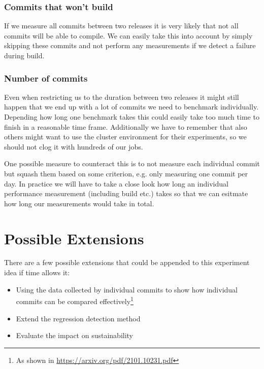 \documentclass[	runningheads,
				a4paper]{llncs}
\begin{document}
\subsubsection{Commits that won't build}
If we measure all commits between two releases it is very likely that not all commits will be able to compile. We can easily take this into account by simply skipping these commits and not perform any measurements if we detect a failure during build.

\subsubsection{Number of commits}
Even when restricting us to the duration between two releases it might still happen that we end up with a lot of commits we need to benchmark individually. Depending how long one benchmark takes this could easily take too much time to finish in a reasonable time frame. Additionally we have to remember that also others might want to use the cluster environment for their experiments, so we should not clog it with hundreds of our jobs.

One possible measure to counteract this is to not measure each individual commit but squash them based on some criterion, e.g. only measuring one commit per day. In practice we will have to take a close look how long an individual performance measurement (including build etc.) takes so that we can esitmate how long our measurements would take in total.

\section{Possible Extensions}
There are a few possible extensions that could be appended to this experiment idea if time allows it:
\begin{itemize}
	\item Using the data collected by individual commits to show how individual commits can be compared effectively\footnote{As shown in \url{https://arxiv.org/pdf/2101.10231.pdf}}
	\item Extend the regression detection method
	\item Evaluate the impact on sustainability
\end{itemize}
	
	
	
	
\end{document}
